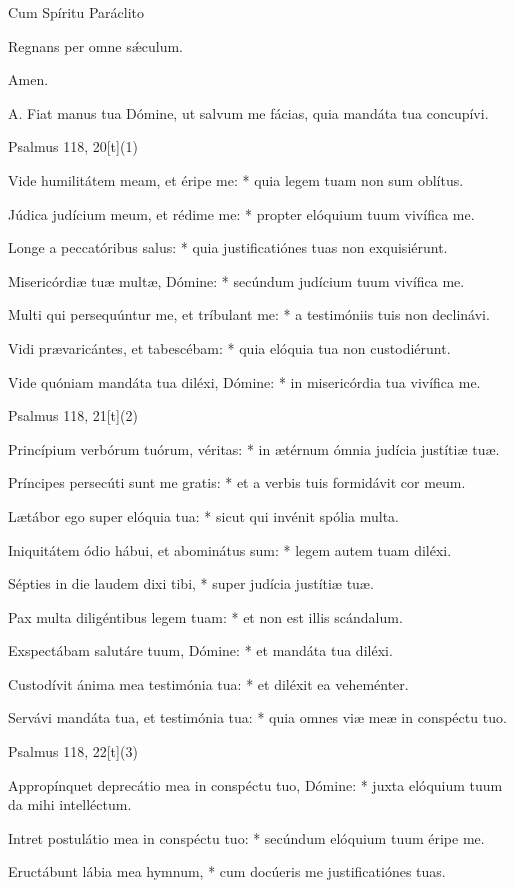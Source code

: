 Cum Spíritu Paráclito

Regnans per omne sǽculum.

Amen.


A. Fiat manus tua Dómine, ut salvum me fácias, quia mandáta tua concupívi.


Psalmus 118, 20[t](1)

Vide humilitátem meam, et éripe me: * quia legem tuam non sum oblítus.

Júdica judícium meum, et rédime me: * propter elóquium tuum vivífica me.

Longe a peccatóribus salus: * quia justificatiónes tuas non exquisiérunt.

Misericórdiæ tuæ multæ, Dómine: * secúndum judícium tuum vivífica me.

Multi qui persequúntur me, et tríbulant me: * a testimóniis tuis non declinávi.

Vidi prævaricántes, et tabescébam: * quia elóquia tua non custodiérunt.

Vide quóniam mandáta tua diléxi, Dómine: * in misericórdia tua vivífica me.

Psalmus 118, 21[t](2)

Princípium verbórum tuórum, véritas: * in ætérnum ómnia judícia justítiæ tuæ.

Príncipes persecúti sunt me gratis: * et a verbis tuis formidávit cor meum.

Lætábor ego super elóquia tua: * sicut qui invénit spólia multa.

Iniquitátem ódio hábui, et abominátus sum: * legem autem tuam diléxi.

Sépties in die laudem dixi tibi, * super judícia justítiæ tuæ.

Pax multa diligéntibus legem tuam: * et non est illis scándalum.

Exspectábam salutáre tuum, Dómine: * et mandáta tua diléxi.

Custodívit ánima mea testimónia tua: * et diléxit ea veheménter.

Servávi mandáta tua, et testimónia tua: * quia omnes viæ meæ in conspéctu tuo.

Psalmus 118, 22[t](3)

Appropínquet deprecátio mea in conspéctu tuo, Dómine: * juxta elóquium tuum da mihi intelléctum.

Intret postulátio mea in conspéctu tuo: * secúndum elóquium tuum éripe me.

Eructábunt lábia mea hymnum, * cum docúeris me justificatiónes tuas.


